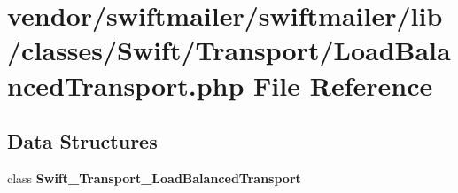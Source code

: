 \section{vendor/swiftmailer/swiftmailer/lib/classes/\+Swift/\+Transport/\+Load\+Balanced\+Transport.php File Reference}
\label{_transport_2_load_balanced_transport_8php}
\subsection*{Data Structures}
\begin{DoxyCompactItemize}
\item 
class {\bf Swift\+\_\+\+Transport\+\_\+\+Load\+Balanced\+Transport}
\end{DoxyCompactItemize}
